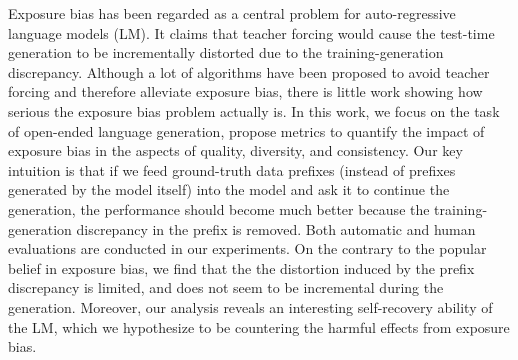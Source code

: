 Exposure bias has been regarded as a central problem for auto-regressive language models (LM). It claims that teacher forcing would cause the test-time generation to be incrementally distorted due to the training-generation discrepancy.  Although a lot of algorithms have been proposed to avoid teacher forcing and therefore alleviate exposure bias, there is little work showing how serious the exposure bias problem actually is. In this work, we focus on the task of open-ended language generation, propose metrics to quantify the impact of exposure bias in the aspects of quality, diversity, and consistency. Our key intuition is that if we feed ground-truth data prefixes (instead of prefixes generated by the model itself) into the model and ask it to continue the generation, the performance should become much better because the training-generation discrepancy in the prefix is removed. Both automatic and human evaluations are conducted in our experiments. On the contrary to the popular belief in exposure bias, we find that the the distortion induced by the prefix discrepancy is limited, and does not seem to be incremental during the generation. Moreover, our analysis reveals an interesting self-recovery ability of the LM, which we hypothesize to be countering the harmful effects from exposure bias.
